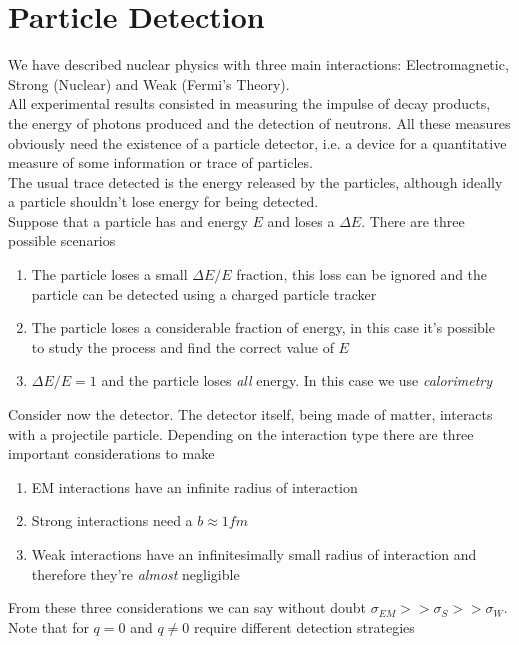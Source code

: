 \documentclass[../qm.tex]{subfiles}
\begin{document}
\section{Particle Detection}
We have described nuclear physics with three main interactions: Electromagnetic, Strong (Nuclear) and Weak (Fermi's Theory).\\
All experimental results consisted in measuring the impulse of decay products, the energy of photons produced and the detection of neutrons. All these measures obviously need the existence of a particle detector, i.e. a device for a quantitative measure of some information or trace of particles.\\
The usual trace detected is the energy released by the particles, although ideally a particle shouldn't lose energy for being detected.\\
Suppose that a particle has and energy $E$ and loses a $\Delta E$. There are three possible scenarios
\begin{enumerate}
\item The particle loses a small $\Delta E/E$ fraction, this loss can be ignored and the particle can be detected using a charged particle tracker
\item The particle loses a considerable fraction of energy, in this case it's possible to study the process and find the correct value of $E$
\item $\Delta E/E=1$ and the particle loses \textit{all} energy. In this case we use \emph{calorimetry}
\end{enumerate}
Consider now the detector. The detector itself, being made of matter, interacts with a projectile particle. Depending on the interaction type there are three important considerations to make
\begin{enumerate}
\item EM interactions have an infinite radius of interaction
\item Strong interactions need a $b\approx1\unit{fm}$
\item Weak interactions have an infinitesimally small radius of interaction and therefore they're \textit{almost} negligible
\end{enumerate}
From these three considerations we can say without doubt $\sigma_{EM}>>\sigma_S>>\sigma_W$. Note that for $q=0$ and $q\ne0$ require different detection strategies
\end{document}
